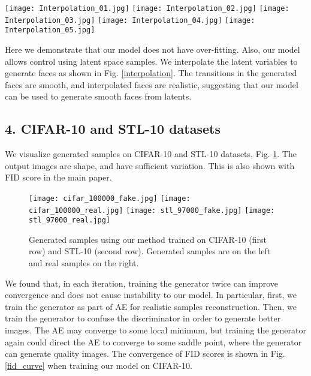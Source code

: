 \documentclass[runningheads]{llncs}
\begin{document}
\begin{figure*}
\centering
\texttt{[image: Interpolation\_01.jpg]}
\texttt{[image: Interpolation\_02.jpg]}
\texttt{[image: Interpolation\_03.jpg]}
\texttt{[image: Interpolation\_04.jpg]}
\texttt{[image: Interpolation\_05.jpg]}
\caption{Samples generated by our method from interpolated latents.}
\label{interpolation}
\end{figure*}

Here we  demonstrate that our model does not have  over-fitting.
Also, our model allows control using latent space samples. We interpolate the latent variables to generate faces as shown in Fig. \ref{interpolation}. The transitions in the generated faces are smooth, and interpolated faces are realistic, suggesting that our model can be used  to generate smooth faces from latents.

\subsection*{4. CIFAR-10 and STL-10 datasets}

We visualize generated samples on CIFAR-10 and STL-10 datasets, Fig. \ref{cifar_generated_samples}. The output images are shape, and have sufficient variation. This is also shown with FID score in the main paper.

\begin{figure}
\centering
\texttt{[image: cifar\_100000\_fake.jpg]}
\texttt{[image: cifar\_100000\_real.jpg]}
\texttt{[image: stl\_97000\_fake.jpg]}
\texttt{[image: stl\_97000\_real.jpg]}
\caption{Generated samples using our method trained on CIFAR-10 (first row) and STL-10 (second row). Generated samples are on the left and real samples on the right.}
\label{cifar_generated_samples}
\end{figure}

We found that, in each iteration, training the generator twice can improve convergence and does not cause instability to our model. In particular, first, we train the generator as part of AE for realistic samples reconstruction. Then, we train the generator to confuse the discriminator in order to generate better images. The AE may converge to some local minimum, but training the generator again could direct the AE to converge  to some saddle point, where the generator can generate quality images. The convergence of FID scores is shown in Fig. \ref{fid_curve} when training our model on CIFAR-10.
\end{document}
